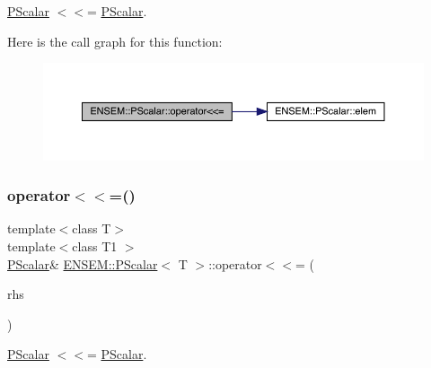 \mbox{\hyperlink{classENSEM_1_1PScalar}{P\+Scalar}} $<$$<$= \mbox{\hyperlink{classENSEM_1_1PScalar}{P\+Scalar}}. 

Here is the call graph for this function\+:
\nopagebreak
\begin{figure}[H]
\begin{center}
\leavevmode
\includegraphics[width=350pt]{d3/d27/classENSEM_1_1PScalar_ade643675ab6ef041676e1098ac740b29_cgraph}
\end{center}
\end{figure}
\mbox{\label{classENSEM_1_1PScalar_ade643675ab6ef041676e1098ac740b29}} 
\subsubsection{\texorpdfstring{operator$<$$<$=()}{operator<<=()}\hspace{0.1cm}{\footnotesize\ttfamily [3/3]}}
{\footnotesize\ttfamily template$<$class T$>$ \\
template$<$class T1 $>$ \\
\mbox{\hyperlink{classENSEM_1_1PScalar}{P\+Scalar}}\& \mbox{\hyperlink{classENSEM_1_1PScalar}{E\+N\+S\+E\+M\+::\+P\+Scalar}}$<$ T $>$\+::operator$<$$<$= (\begin{DoxyParamCaption}\item[{const \mbox{\hyperlink{classENSEM_1_1PScalar}{P\+Scalar}}$<$ T1 $>$ \&}]{rhs }\end{DoxyParamCaption})\hspace{0.3cm}{\ttfamily [inline]}}



\mbox{\hyperlink{classENSEM_1_1PScalar}{P\+Scalar}} $<$$<$= \mbox{\hyperlink{classENSEM_1_1PScalar}{P\+Scalar}}. 

